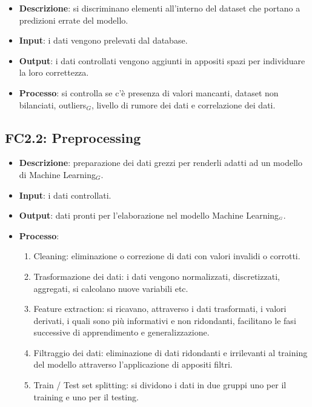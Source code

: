 \begin{itemize}
	\item \textbf{Descrizione}: si discriminano elementi all'interno del dataset che portano a predizioni errate del modello.
	\item \textbf{Input}: i dati vengono prelevati dal database.
	\item \textbf{Output}: i dati controllati vengono aggiunti in appositi spazi per individuare la loro correttezza.
	\item \textbf{Processo}: si controlla se c'è presenza di valori mancanti, dataset non bilanciati, outliers$_G$, livello di rumore dei dati e correlazione dei dati. 
\end{itemize}

\subsection{FC2.2: Preprocessing}\label{fasiProgettoElaborazioneDatiPreprocessing}

\begin{itemize}
	\item \textbf{Descrizione}: preparazione dei dati grezzi per renderli adatti ad un modello di Machine Learning$_G$. 
	\item \textbf{Input}: i dati controllati.
	\item \textbf{Output}: dati pronti per l'elaborazione nel modello Machine Learning$_{\scaleto{G}{3pt}}$.
	\item \textbf{Processo}: \begin{enumerate}[leftmargin = 2cm]
		\item Cleaning: eliminazione o correzione di dati con valori invalidi o corrotti.
		\item Trasformazione dei dati: i dati vengono normalizzati, discretizzati, aggregati, si calcolano nuove variabili etc.
		\item Feature extraction: si ricavano, attraverso i dati trasformati, i valori derivati, i quali sono più informativi e non ridondanti, facilitano le fasi successive di apprendimento e generalizzazione.
		\item Filtraggio dei dati: eliminazione di dati ridondanti e irrilevanti al training del modello attraverso l'applicazione di appositi filtri.
		\item Train / Test set splitting: si dividono i dati in due gruppi uno per il training e uno per il testing.
	\end{enumerate}

\end{itemize}

